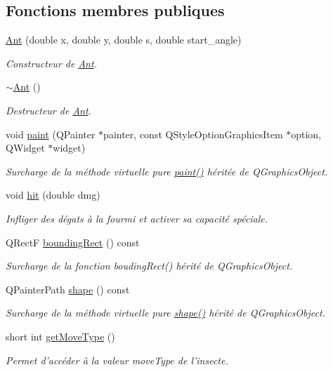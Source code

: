 \subsection*{Fonctions membres publiques}
\begin{DoxyCompactItemize}
\item 
\hyperlink{classAnt_a52f0aed092463606f4d4edd2091d92eb}{Ant} (double x, double y, double s, double start\_\-angle)
\begin{DoxyCompactList}\small\item\em Constructeur de \hyperlink{classAnt}{Ant}. \end{DoxyCompactList}\item 
\hyperlink{classAnt_a33ca6bd592236726a18a2159908e4116}{$\sim$Ant} ()
\begin{DoxyCompactList}\small\item\em Destructeur de \hyperlink{classAnt}{Ant}. \end{DoxyCompactList}\item 
void \hyperlink{classAnt_abb2b56b817ce45d815251549a77402be}{paint} (QPainter $\ast$painter, const QStyleOptionGraphicsItem $\ast$option, QWidget $\ast$widget)
\begin{DoxyCompactList}\small\item\em Surcharge de la méthode virtuelle pure \hyperlink{classAnt_abb2b56b817ce45d815251549a77402be}{paint()} héritée de QGraphicsObject. \end{DoxyCompactList}\item 
void \hyperlink{classAnt_a64b0e0e7d2605c1a5a0906587ab70920}{hit} (double dmg)
\begin{DoxyCompactList}\small\item\em Infliger des dégats à la fourmi et activer sa capacité spéciale. \end{DoxyCompactList}\item 
QRectF \hyperlink{classBug_a9b39c25361faad07b1bf2dd927d09dab}{boundingRect} () const 
\begin{DoxyCompactList}\small\item\em Surcharge de la fonction boudingRect() hérité de QGraphicsObject. \end{DoxyCompactList}\item 
QPainterPath \hyperlink{classBug_a587a36d3145c2b4dba6c689af22c65ac}{shape} () const 
\begin{DoxyCompactList}\small\item\em Surcharge de la méthode virtuelle pure \hyperlink{classBug_a587a36d3145c2b4dba6c689af22c65ac}{shape()} hérité de QGraphicsObject. \end{DoxyCompactList}\item 
short int \hyperlink{classBug_aced471cedcfa855baddf4c827003e755}{getMoveType} ()
\begin{DoxyCompactList}\small\item\em Permet d'accéder à la valeur moveType de l'insecte. \end{DoxyCompactList}\end{DoxyCompactItemize}
